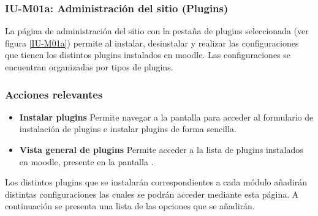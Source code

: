 \subsubsection{IU-M01a: Administración del sitio (Plugins)}

 La página de administración del sitio con la pestaña de plugins seleccionada (ver figura
 \ref{IU-M01a}) permite al  instalar, desinstalar y realizar las
 configuraciones que tienen los distintos plugins instalados en moodle. Las configuraciones se
 encuentran organizadas por tipos de plugins.

 
\subsubsection{Acciones relevantes}

    \begin{itemize}
    \item {\bf Instalar plugins}
        Permite navegar a la pantalla  para acceder al formulario de
        instalación de plugins e instalar plugins de forma sencilla.

    \item {\bf Vista general de plugins}
        Permite acceder a la lista de plugins instalados en moodle, presente en la pantalla
        .
    \end{itemize}

 \noindent 
 Los distintos plugins que se instalarán correspondientes a cada módulo añadirán distintas
 configuraciones las cuales se podrán acceder mediante esta página. A continuación se presenta
 una lista de las opciones que se añadirán.

